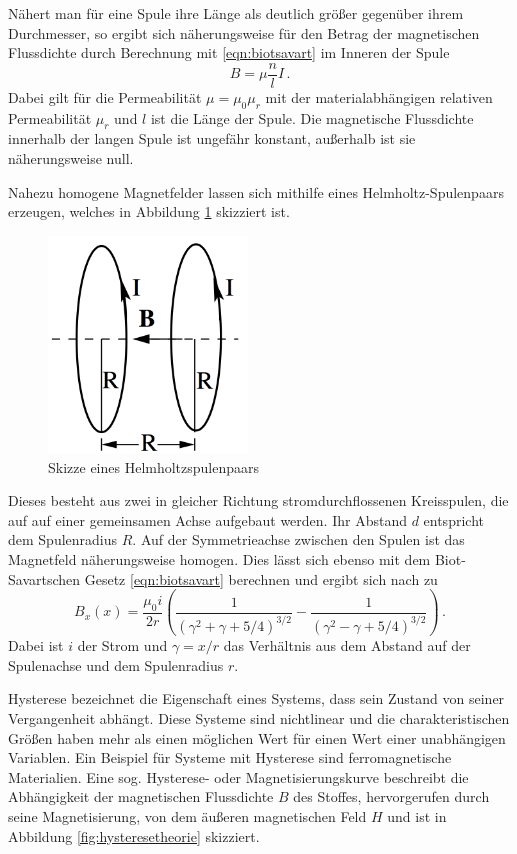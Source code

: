 Nähert man für eine Spule ihre Länge als deutlich größer gegenüber ihrem Durchmesser,
so ergibt sich näherungsweise für den Betrag der magnetischen Flussdichte durch Berechnung mit \eqref{eqn:biotsavart}
im Inneren der Spule
\begin{equation}
  B = \mu \frac{n}{l} I\,.
  \label{eqn:langespuleinnen}
\end{equation}
Dabei gilt für die Permeabilität $\mu = \mu_0 \mu_r$ mit der materialabhängigen
relativen Permeabilität $\mu_r$ und $l$ ist die Länge der Spule.
Die magnetische Flussdichte innerhalb der langen Spule ist ungefähr konstant, außerhalb
ist sie näherungsweise null.

Nahezu homogene Magnetfelder lassen sich mithilfe eines Helmholtz-Spulenpaars erzeugen, welches
in Abbildung \ref{fig:helmholtz} skizziert ist.

\begin{figure}
  \centering
  \includegraphics[width=150pt]{data/helmholtz.png}
  \caption{Skizze eines Helmholtzspulenpaars \cite{Versuchsanleitung}}
  \label{fig:helmholtz}
\end{figure}

Dieses besteht aus zwei in gleicher Richtung stromdurchflossenen Kreisspulen, die auf
auf einer gemeinsamen Achse aufgebaut werden. Ihr Abstand $d$ entspricht dem Spulenradius $R$.
Auf der Symmetrieachse zwischen den Spulen ist das Magnetfeld näherungsweise homogen. Dies lässt sich
ebenso mit dem Biot-Savartschen Gesetz \eqref{eqn:biotsavart} berechnen und ergibt sich nach \cite{Helmholtz} zu
\begin{equation}
  B_x(x) = \frac{\mu_0 i}{2 r} \left( \frac{1}{(\gamma^2+\gamma+5/4)^{3/2}} - \frac{1}{(\gamma^2-\gamma+5/4)^{3/2}} \right) \,.
  \label{eqn:helmholz}
\end{equation}
Dabei ist $i$ der Strom und $\gamma = x/r$ das Verhältnis aus dem Abstand auf der Spulenachse und dem Spulenradius $r$.

Hysterese bezeichnet die Eigenschaft eines Systems, dass sein Zustand von seiner Vergangenheit abhängt.
Diese Systeme sind nichtlinear und die charakteristischen Größen haben mehr als einen möglichen Wert für
einen Wert einer unabhängigen Variablen. Ein Beispiel für Systeme mit Hysterese sind
ferromagnetische Materialien. Eine sog. Hysterese- oder Magnetisierungskurve beschreibt
die Abhängigkeit der magnetischen Flussdichte $B$ des Stoffes, hervorgerufen durch
seine Magnetisierung, von dem äußeren magnetischen Feld $H$ und ist in Abbildung \ref{fig:hysteresetheorie}
skizziert.

